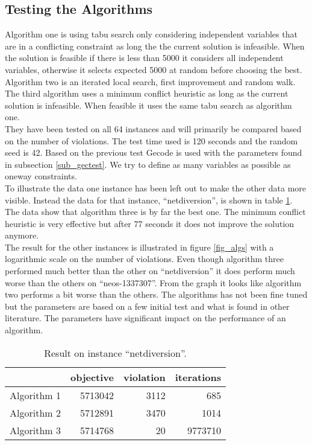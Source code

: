 \subsection{Testing the Algorithms}
Algorithm one is using tabu search only considering independent variables that are in a conflicting constraint as long 
the the current solution is infeasible. When the solution is feasible if there 
is less than 5000 it considers all independent variables, otherwise it selects expected 5000 at random before choosing 
the best. \\ 
Algorithm two is an iterated local search, first improvement and random walk. The third algorithm uses a minimum 
conflict heuristic as long as the current solution is infeasible. When feasible it uses the same tabu search as 
algorithm one. \\ 
They have been tested on all 64 instances and will primarily be compared based on the number of violations. The test 
time used is 120 seconds and the random seed is 42. Based on the previous test Gecode is used with the parameters found 
in subsection \ref{sub_gectest}. We try to define as many variables as possible as oneway constraints. \\ 
To illustrate the data one instance has been left out to make the other data more visible. Instead the data for that 
instance, ``netdiversion'', is shown in table \ref{tab_netd}. The data show that algorithm three is by far the best 
one. The minimum conflict heuristic is very effective but after 77 seconds it does not improve the solution anymore. \\ 
The result for the other instances is illustrated in figure \ref{fig_algs} with a logarithmic scale on the number of 
violations. Even though algorithm three performed much better than the other on ``netdiversion'' it does perform much 
worse than the others on ``neos-1337307''. From the graph it looks like algorithm two performs a bit worse than the 
others. The algorithms has not been fine tuned but the parameters are based on a few initial test and what is found in 
other literature. The parameters have significant impact on the performance of an algorithm. \\ 

\begin{table}[b]
\centering
\begin{tabular}{|r|r|r|r|}
\hline
            & objective    & violation & iterations \\ \hline
Algorithm 1 & 5713042 & 3112      & 685        \\ \hline
Algorithm 2 & 5712891 & 3470      & 1014       \\ \hline
Algorithm 3 & 5714768 & 20        & 9773710    \\ \hline
\end{tabular}
\caption{Result on instance ``netdiversion''.}
\label{tab_netd}
\end{table}


